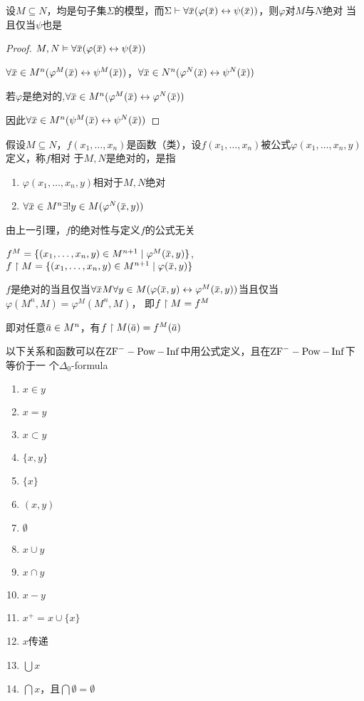 \documentclass[11pt]{article}
\begin{document}
\begin{lemma}[]
设\(M\subseteq N\)，均是句子集\(\Sigma\)的模型，而\(\Sigma\vdash\forall\barx(\varphi(\barx)\leftrightarrow\psi(\barx))\)，则\(\varphi\)对\(M\)与\(N\)绝对
当且仅当\(\psi\)也是
\end{lemma}

\begin{proof}
\(M,N\vDash\forall\barx(\varphi(\barx)\leftrightarrow\psi(\barx))\)

\(\forall\barx\in M^n(\varphi^M(\barx)\leftrightarrow\psi^M(\barx))\)，\(\forall\barx\in N^n(\varphi^N(\barx)\leftrightarrow\psi^N(\barx))\)

若\(\varphi\)是绝对的,\(\forall\barx\in M^n(\varphi^M(\barx)\leftrightarrow\varphi^N(\barx))\)

因此\(\forall\barx\in M^n(\psi^M(\barx)\leftrightarrow\psi^N(\barx))\)
\end{proof}

\begin{definition}[]
假设\(M\subseteq N\)，\(f(x_1,\dots,x_n)\)是函数（类），设\(f(x_1,\dots,x_n)\)被公式\(\varphi(x_1,\dots,x_n,y)\)定义，称\(f\)相对
于\(M,N\)是绝对的，是指
\begin{enumerate}
\item \(\varphi(x_1,\dots,x_n,y)\)相对于\(M,N\)绝对
\item \(\forall\barx\in M^n\exists!y\in M(\varphi^N(\barx,y))\)
\end{enumerate}
\end{definition}

由上一引理，\(f\)的绝对性与定义\(f\)的公式无关

\(f^M=\{(x_1,\dots,x_n,y)\in M^{n+1}\mid\varphi^M(\barx,y)\}\),\(f\uhr M=\{(x_1,\dots,x_n,y)\in M^{n+1}\mid\varphi(\barx,y)\}\)

\(f\)是绝对的当且仅当\(\forall\barx M\forall y\in M(\varphi(\barx,y)\leftrightarrow\varphi^M(\barx,y))\)当且仅当\(\varphi(M^n,M)=\varphi^M(M^n,M)\)，
即\(f\upharpoonright M=f^M\)

即对任意\(\bara\in M^n\)，有\(f\uhr M(\bara)=f^M(\bara)\)

\begin{theorem}[]
以下关系和函数可以在\(\text{ZF}^--\operatorname{Pow}-\operatorname{Inf}\)中用公式定义，且在\(\text{ZF}^--\operatorname{Pow}-\operatorname{Inf}\)下等价于一
个\(\Delta_0\)-formula
\begin{enumerate}
\item \(x\in y\)
\item \(x=y\)
\item \(x\subset y\)
\item \(\{x,y\}\)
\item \(\{x\}\)
\item \((x,y)\)
\item \(\emptyset\)
\item \(x\cup y\)
\item \(x\cap y\)
\item \(x-y\)
\item \(x^+=x\cup\{x\}\)
\item \(x\)传递
\item \(\bigcup x\)
\item \(\bigcap x\)，且\(\bigcap\emptyset=\emptyset\)
\end{enumerate}
\end{theorem}
\end{document}
